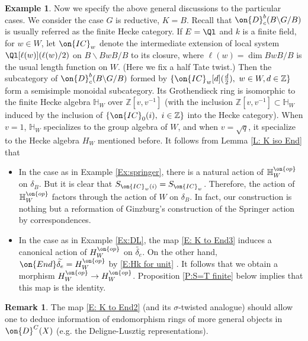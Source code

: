\documentclass[11pt]{amsart}
\theoremstyle{definition}
\theoremstyle{definition}
\newtheorem{ex}[thm]{Example}
\newtheorem{rmk}[thm]{Remark}
\theoremstyle{definition}
\numberwithin{equation}{subsection}
\newcommand{\bH}{{\mathbb H}}
\newcommand{\bZ}{{\mathbb Z}}
\newcommand{\End}{{\on{End}}}
\newcommand{\IC}{\on{IC}}
\begin{document}
\begin{ex}
Now we specify the above general discussions to the particular cases.
We consider the case $G$ is reductive, $K=B$. Recall that $\on{D}_c^b(B\backslash G/B)$ is usually referred as the finite Hecke category.
If $E=\Ql$ and $k$ is a finite field,  for $w\in W$, let $\IC_w$ denote the intermediate extension of local system $\Ql[\ell(w)](\ell(w)/2)$ on $B\backslash BwB/B$ to its closure, where $\ell(w)=\dim BwB/B$ is the usual length function on $W$. (Here we fix a half Tate twist.)
Then the subcategory of $\on{D}_c^b(B\backslash G/B)$ formed by $\{\IC_w[d](\frac{d}{2}),\ w\in W, d\in \bZ\}$ form a semisimple monoidal subcategory. Its Grothendieck ring is isomorphic to
the finite Hecke algebra $\mathbb H_W$ over $\bZ[v,v^{-1}]$ (with the inclusion $\bZ[v,v^{-1}]\subset \mathbb H_W$ induced by the inclusion of $\{\on{IC}_0(i), \ i\in\bZ\}$ into the Hecke category). When $v=1$, $\mathbb H_W$ specializes to the group algebra of $W$, and when $v=\sqrt{q}$, it specialize to the Hecke algebra $H_W$ mentioned before.
It follows from Lemma \ref{L: K iso End} that
\begin{itemize}
\item In the case as in Example \ref{Ex:springer}, there is a natural action of $\bH^{\on{op}}_W$ on $\delta_B$. But it is clear that $S_{\IC_w(i)}=S_{\IC_w}$. Therefore, the action of $\bH^{\on{op}}_W$ factors through the action of $W$ on $\delta_B$. In fact, our construction is nothing but a reformation of Ginzburg's construction of the Springer action by correspondences.
\item In the case as in Example \ref{Ex:DL}, the map \eqref{E: K to End3} induces a canonical action of $H_W^{\on{op}}$ on $\widetilde{\delta_e}$. On the other hand,
$\End\widetilde{\delta_e}=H_W^{\on{op}}$ by \eqref{E:Hk for unit} . It follows that we obtain a morphism $H^{\on{op}}_W\to H^{\on{op}}_W$. Proposition \ref{P:S=T finite} below implies that this map is the identity.
\end{itemize}
\end{ex}
\begin{rmk}
The map \eqref{E: K to End2} (and its $\sigma$-twisted analogue) should allow one to deduce information of endomorphism rings of more general objects in $\on{D}^C(X)$ (e.g. the Deligne-Lusztig representations). 
\end{rmk}
\end{document}
